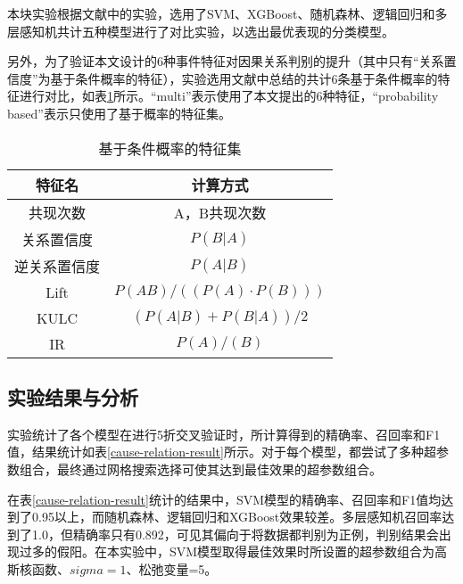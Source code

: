 本块实验根据文献\parencite{nie2016mining-causality-graph,qiu2020causality-mining-knowledge-graph}中的实验，选用了SVM、XGBoost、随机森林、逻辑回归和多层感知机共计五种模型进行了对比实验，以选出最优表现的分类模型。

另外，为了验证本文设计的6种事件特征对因果关系判别的提升（其中只有“关系置信度”为基于条件概率的特征），实验选用文献\parencite{nie2016mining-causality-graph}中总结的共计6条基于条件概率的特征进行对比，如表\ref{only-prob-feature}所示。“multi”表示使用了本文提出的6种特征，“probability based”表示只使用了基于概率的特征集。
\begin{table}[htbp]
    \caption{基于条件概率的特征集}
    \centering
    \label{only-prob-feature}
    \begin{tabular}{cc}
    \toprule
    特征名    & 计算方式                  \\ \midrule
    共现次数   & A，B共现次数               \\
    关系置信度  & $P(B|A)$                \\
    逆关系置信度 & $P(A|B)$                \\
    Lift  & $P(AB)/((P(A) \cdot P(B)))$ \\
    KULC   & $(P(A|B) + P(B|A))/2$   \\
    IR     & $P(A)/(B)$              \\ 
    \bottomrule
    \end{tabular}
    \end{table}

\subsection{实验结果与分析}
实验统计了各个模型在进行5折交叉验证时，所计算得到的精确率、召回率和F1值，结果统计如表\ref{cause-relation-result}所示。对于每个模型，都尝试了多种超参数组合，最终通过网格搜索选择可使其达到最佳效果的超参数组合。

在表\ref{cause-relation-result}统计的结果中，SVM模型的精确率、召回率和F1值均达到了0.95以上，而随机森林、逻辑回归和XGBoost效果较差。多层感知机召回率达到了1.0，但精确率只有0.892，可见其偏向于将数据都判别为正例，判别结果会出现过多的假阳。在本实验中，SVM模型取得最佳效果时所设置的超参数组合为高斯核函数、$sigma=1$、松弛变量=5。


